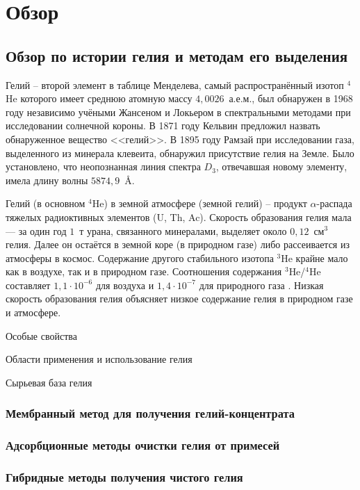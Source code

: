 \chapter{Обзор} \label{chapt_1}
\section{Обзор по истории гелия и методам его выделения} \label{section_1_1}

Гелий -- второй элемент в таблице Менделева, самый распространённый  изотоп $^4$He которого имеет среднюю атомную массу  $4,0026$~а.е.м., был обнаружен в 1968 году независимо учёными Жансеном и Локьером в спектральными методами при исследовании солнечной короны. В 1871 году Кельвин предложил назвать обнаруженное вещество <<гелий>>.
В 1895 году Рамзай при исследовании газа, выделенного из минерала клевеита, обнаружил присутствие гелия на Земле. Было установлено, что неопознанная линия спектра $D_3$, отвечавшая новому элементу, имела длину волны $5874,9$~\AA \cite{Fastovskii}.

Гелий (в основном $^4$He) в земной атмосфере (земной гелий) -- продукт $\alpha$-распада тяжелых радиоктивных элементов  (U, Th, Ac). Скорость образования гелия мала --- за один год $1$~т урана, связанного минералами, выделяет около $0,12$~см$^3$ гелия. Далее он остаётся в земной коре (в природном газе) либо рассеивается из атмосферы в космос. Содержание другого стабильного изотопа $^3$He крайне мало как в воздухе, так и в природном газе. Соотношения содержания  $^3$He/$^4$He составляет $1,1\cdot 10^{-6}$ для воздуха и $1,4\cdot 10^{-7}$ для природного газа \cite{Fastovskii}. Низкая скорость образования гелия объясняет низкое содержание гелия в природном газе и атмосфере.

Особые свойства \cite{Yakuceni_Helium}

Области применения и использование гелия  \cite{Yakuceni_Helium, Yakuceni_USA}

Сырьевая база гелия \cite{Yakuceni_Material_Base}


\subsection{Мембранный метод для получения гелий-концентрата} \label{section_1_1_1}

\subsection{Адсорбционные методы очистки гелия от примесей} \label{section_1_1_2}

\subsection{Гибридные методы получения чистого гелия} \label{section_1_1_3}